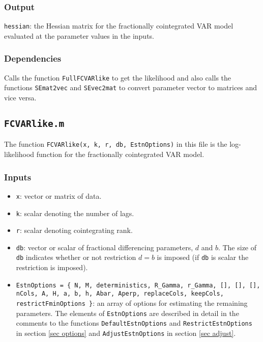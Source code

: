 \documentclass[12pt]{article}
\begin{document}
\subsubsection*{Output}

\texttt{hessian}: the Hessian matrix for the fractionally cointegrated VAR model evaluated at the parameter values in the inputs. 


\subsubsection*{Dependencies}

Calls the function \texttt{FullFCVARlike} to get the likelihood and also calls the functions \texttt{SEmat2vec} and \texttt{SEvec2mat} to convert parameter vector to matrices and vice versa. 






\newpage


\subsection{\texttt{FCVARlike.m}}

The function \texttt{FCVARlike(x, k, r, db, EstnOptions)} in this file is the log-likelihood function for the fractionally cointegrated VAR model.

\subsubsection*{Inputs}

\begin{itemize}

\item \texttt{x}: vector or matrix of data.

\item \texttt{k}: scalar denoting the number of lags.

\item \texttt{r}: scalar denoting cointegrating rank.

\item \texttt{db}: vector or scalar of fractional differencing parameters, $d$ and $b$. The size of \texttt{db} indicates whether or not restriction $d=b$ is imposed (if \texttt{db} is scalar the restriction is imposed).

\item \texttt{EstnOptions = \{ N, M, deterministics, R\_Gamma, r\_Gamma, [], [], [], nCols, A, H, a, b, h, Abar, Aperp, replaceCols, keepCols, restrictFminOptions \}}: an array of options for estimating the remaining parameters. The elements of \texttt{EstnOptions} are described in detail in the comments to the functions \texttt{DefaultEstnOptions} and \texttt{RestrictEstnOptions} in section \ref{sec options} and \texttt{AdjustEstnOptions} in section \ref{sec adjust}. 

\end{itemize}
\end{document}
